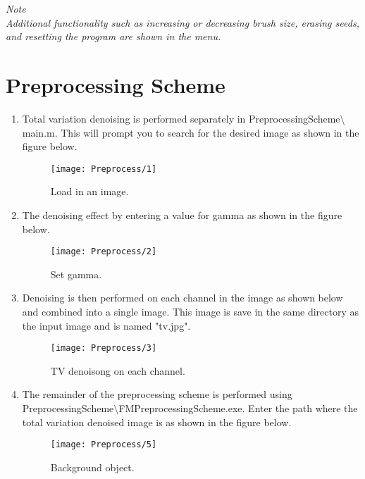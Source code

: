 \documentclass[
11pt, %
a4paper, %
oneside, %
headinclude,footinclude, %
BCOR5mm, %
]{scrartcl}
\begin{document}
\textit{Note}\\
\textit{Additional functionality such as increasing or decreasing brush size, erasing seeds, and resetting the program are shown in the menu.}

\clearpage
\section{Preprocessing Scheme}
\begin{enumerate}
	\item
	Total variation denoising is performed separately in PreprocessingScheme$\setminus$main.m. This will prompt you to search for the desired image as shown in the figure below.
	\begin{figure}[h]
		\centering
		\texttt{[image: Preprocess/1]}
		\caption{Load in an image.}
	\end{figure}
	
	\item The denoising effect by entering a value for gamma as shown in the figure below.
	\begin{figure}[h]
		\centering
		\texttt{[image: Preprocess/2]}
		\caption{Set gamma.}
	\end{figure}
	
	\item Denoising is then performed on each channel in the image as shown below and combined into a single image. This image is save in the same directory as the input image and is named "tv.jpg".
	\begin{figure}[h]
		\centering
		\texttt{[image: Preprocess/3]}
		\caption{TV denoisong on each channel.}
	\end{figure}
	
	\newpage
%	
	\item The remainder of the preprocessing scheme is performed using\\ PreprocessingScheme$\setminus$FMPreprocessingScheme.exe. Enter the path where the total variation denoised image is as shown in the figure below.
	\begin{figure}[h]
		\centering
		\texttt{[image: Preprocess/5]}
		\caption{Background object.}
	\end{figure}
	

\end{enumerate}
\end{document}
